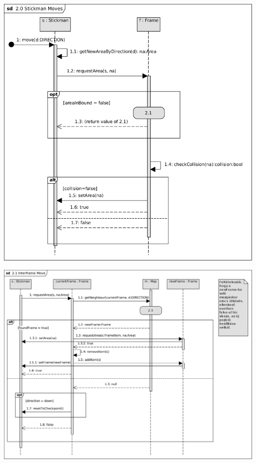 \begin{center}\includegraphics[scale=1]{resources/20StickmanMoves.png}\end{center}
\begin{center}\includegraphics[scale=0.8, angle=-90]{resources/21InterframeMove.png}\end{center}
